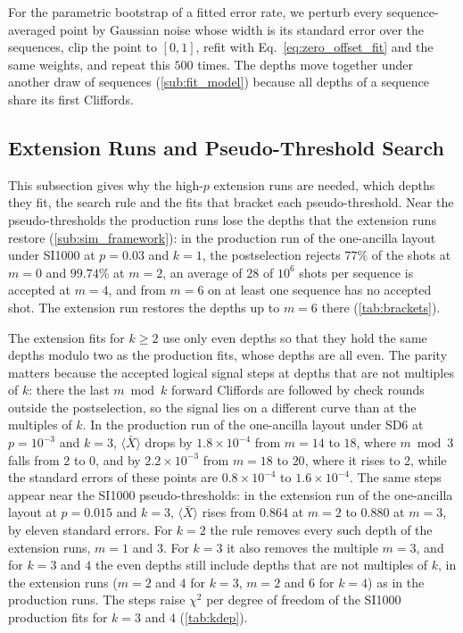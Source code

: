 For the parametric bootstrap of a fitted error rate, we perturb every sequence-averaged point by Gaussian noise whose width is its standard error over the sequences, clip the point to $[0, 1]$, refit with Eq.~\eqref{eq:zero_offset_fit} and the same weights, and repeat this $500$ times. The depths move together under another draw of sequences (\autoref{sub:fit_model}) because all depths of a sequence share its first Cliffords.

\subsection{Extension Runs and Pseudo-Threshold Search}
\label{app:campaign-search}

This subsection gives why the high-$p$ extension runs are needed, which depths they fit, the search rule and the fits that bracket each pseudo-threshold. Near the pseudo-thresholds the production runs lose the depths that the extension runs restore (\autoref{sub:sim_framework}): in the production run of the one-ancilla layout under SI1000 at $p = 0.03$ and $k = 1$, the postselection rejects $77\%$ of the shots at $m = 0$ and $99.74\%$ at $m = 2$, an average of $28$ of $10^6$ shots per sequence is accepted at $m = 4$, and from $m = 6$ on at least one sequence has no accepted shot. The extension run restores the depths up to $m = 6$ there (\autoref{tab:brackets}).

The extension fits for $k \ge 2$ use only even depths so that they hold the same depths modulo two as the production fits, whose depths are all even. The parity matters because the accepted logical signal steps at depths that are not multiples of $k$: there the last $m \bmod k$ forward Cliffords are followed by check rounds outside the postselection, so the signal lies on a different curve than at the multiples of $k$. In the production run of the one-ancilla layout under SD6 at $p = 10^{-3}$ and $k = 3$, $\langle \bar{X} \rangle$ drops by $1.8\times10^{-4}$ from $m = 14$ to $18$, where $m \bmod 3$ falls from 2 to 0, and by $2.2\times10^{-3}$ from $m = 18$ to $20$, where it rises to 2, while the standard errors of these points are $0.8\times10^{-4}$ to $1.6\times10^{-4}$. The same steps appear near the SI1000 pseudo-thresholds: in the extension run of the one-ancilla layout at $p = 0.015$ and $k = 3$, $\langle \bar{X} \rangle$ rises from $0.864$ at $m = 2$ to $0.880$ at $m = 3$, by eleven standard errors. For $k = 2$ the rule removes every such depth of the extension runs, $m = 1$ and $3$. For $k = 3$ it also removes the multiple $m = 3$, and for $k = 3$ and $4$ the even depths still include depths that are not multiples of $k$, in the extension runs ($m = 2$ and $4$ for $k = 3$, $m = 2$ and $6$ for $k = 4$) as in the production runs. The steps raise $\chi^2$ per degree of freedom of the SI1000 production fits for $k = 3$ and $4$ (\autoref{tab:kdep}).

